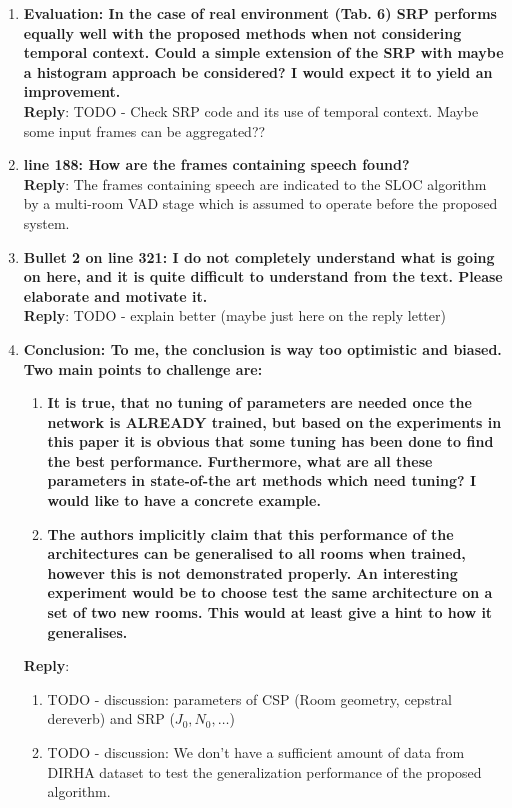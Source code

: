 \documentclass[11pt, technote, letterpaper, oneside, onecolumn]{IEEEtran}
\begin{document}
\begin{enumerate}
\item \textbf{Evaluation: In the case of real environment (Tab. 6) SRP performs equally well with the proposed methods when not considering temporal context. Could a simple extension of the SRP with maybe a histogram approach be considered? I would expect it to yield an improvement.\\}
\textbf{Reply}: TODO - Check SRP code and its use of temporal context. Maybe some input frames can be aggregated??

\item \textbf{line 188: How are the frames containing speech found?\\}
\textbf{Reply}: The frames containing speech are indicated to the SLOC algorithm by a multi-room VAD stage which is assumed to operate before the proposed system.

\item \textbf{Bullet 2 on line 321: I do not completely understand what is going on here, and it is quite difficult to understand from the text. Please elaborate and motivate it.\\}
\textbf{Reply}: TODO - explain better (maybe just here on the reply letter)

\item \textbf{Conclusion: To me, the conclusion is way too optimistic and biased. Two main points to challenge are:\\}
	\begin{enumerate}
		\item  \textbf{It is true, that no tuning of parameters are needed once the network is ALREADY trained, but based on the experiments in this paper it is obvious that some tuning has been done to find the best performance. Furthermore, what are all these parameters in state-of-the art methods which need tuning? I would like to have a concrete example.}
		\item  \textbf{The authors implicitly claim that this performance of the architectures can be generalised to all rooms when trained, however this is not demonstrated properly. An interesting experiment would be to choose test the same architecture on a set of two new rooms. This would at least give a hint to how it generalises.}
	\end{enumerate}
 \textbf{Reply}:
 \begin{enumerate}
 	\item TODO - discussion: parameters of CSP (Room geometry, cepstral dereverb) and SRP ($J_0, N_0, \dots$)
 	\item TODO - discussion: We don't have a sufficient amount of data from DIRHA dataset to test the generalization performance of the proposed algorithm. 
 \end{enumerate}


\end{enumerate}
\end{document}
